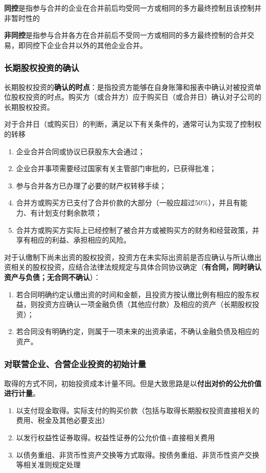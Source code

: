 \documentclass[UTF8,12pt]{ctexart}
\numberwithin{equation}{section} %
\numberwithin{figure}{section}
\numberwithin{table}{section}
\begin{document}
	\textbf{同控}是指参与合并的企业在合并前后均受同一方或相同的多方最终控制且该控制并非暂时性的
	
	\textbf{非同控}是指参与合并各方在合并前后不受同一方或相同的多方最终控制的合并交易，即同控下企业合并以外的其他企业合并。
	
	\subsubsection{长期股权投资的确认}
	长期股权投资的\textbf{确认的时点}：是指投资方能够在自身账簿和报表中确认对被投资单位股权投资的时点。购买方（或合并方）应于购买日（或合并日）确认对子公司的长期股权投资。
	
	对于合并日（或购买日）的判断，满足以下有关条件的，通常可认为实现了控制权的转移
	\begin{enumerate}
		\item 企业合并合同或协议已获股东大会通过；
		
		\item 企业合并事项需要经过国家有关主管部门审批的，已获得批准；
			
		\item 参与合并各方已办理了必要的财产权转移手续；
		
		\item 合并方或购买方已支付了合并价款的大部分（一般应超过50\%），并且有能力、有计划支付剩余款项；
		
		\item 合并方或购买方实际上已经控制了被合并方或被购买方的财务和经营政策，并享有相应的利益、承担相应的风险。
	\end{enumerate}
	
	
	对于认缴制下尚未出资的股权投资，投资方在未实际出资前是否应确认与所认缴出资相关的股权投资，应结合法律法规规定与具体合同协议确定（\textbf{有合同，同时确认资产与负债；无合同不确认}）：
	\begin{enumerate}
		\item 若合同明确约定认缴出资的时间和金额，且投资方按认缴比例有相应的股东权益，则投资方应确认一项金融负债（其他应付款）及相应的资产（长期股权投资）；
		
		\item 若合同没有明确约定，则属于一项未来的出资承诺，不确认金融负债及相应的资产。
	\end{enumerate}

	\subsubsection{对联营企业、合营企业投资的初始计量}
	取得的方式不同，初始投资成本计量不同。但是大致思路是以\textbf{付出对价的公允价值进行计量}。
	\begin{enumerate}
		\item 以支付现金取得。实际支付的购买价款（包括与取得长期股权投资直接相关的费用、税金及其他必要支出）
		
		\item 以发行权益性证券取得。权益性证券的公允价值+直接相关费用
		
		\item 以债务重组、非货币性资产交换等方式取得。按债务重组、非货币性资产交换等相关准则规定处理
	\end{enumerate}
	
\end{document}
